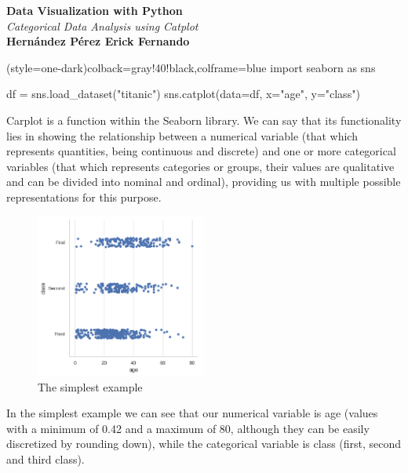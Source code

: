\documentclass[10pt]{extarticle}
\begin{document}
\begin{center}
    \textbf{\huge Data Visualization with Python} \\
    \vspace{0.5cm}
    \textit{Categorical Data Analysis using Catplot} \\
    \vspace{1cm}
    \textbf{Hernández Pérez Erick Fernando} \\
    \vspace{0.5cm}
\end{center}

\begin{python}(style=one-dark){colback=gray!40!black,colframe=blue}
import seaborn as sns

df = sns.load_dataset("titanic")
sns.catplot(data=df, x="age", y="class")
\end{python}

\noindent Carplot is a function within the Seaborn library. We can say that its functionality lies in showing the relationship between a numerical variable (that which represents quantities, being continuous and discrete) and one or more categorical variables (that which represents categories or groups, their values are qualitative and can be divided into nominal and ordinal), providing us with multiple possible representations for this purpose.

\begin{figure}[h!]
    \centering
    \includegraphics[width=0.5\textwidth]{img/catplot_1_0.png} 
    \caption{The simplest example}
    \label{fig:imagen}
\end{figure}

In the simplest example we can see that our numerical variable is age (values with a minimum of 0.42 and a maximum of 80, although they can be easily discretized by rounding down), while the categorical variable is class (first, second and third class).
\end{document}
